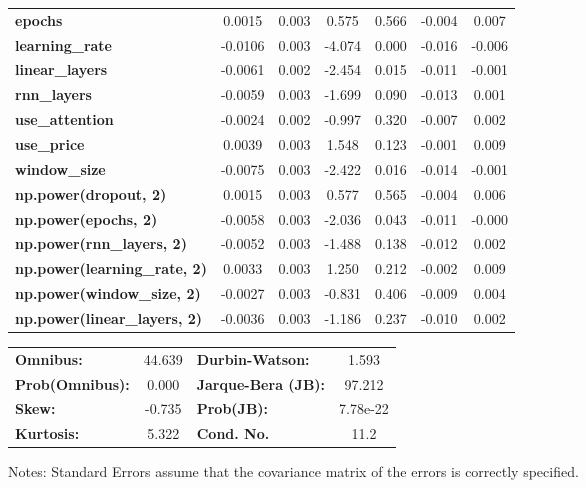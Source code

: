 \begin{center}
\begin{tabular}{lcccccc}
\textbf{epochs}                            &       0.0015  &        0.003     &     0.575  &         0.566        &       -0.004    &        0.007     \\
\textbf{learning\_rate}                    &      -0.0106  &        0.003     &    -4.074  &         0.000        &       -0.016    &       -0.006     \\
\textbf{linear\_layers}                    &      -0.0061  &        0.002     &    -2.454  &         0.015        &       -0.011    &       -0.001     \\
\textbf{rnn\_layers}                       &      -0.0059  &        0.003     &    -1.699  &         0.090        &       -0.013    &        0.001     \\
\textbf{use\_attention}                    &      -0.0024  &        0.002     &    -0.997  &         0.320        &       -0.007    &        0.002     \\
\textbf{use\_price}                        &       0.0039  &        0.003     &     1.548  &         0.123        &       -0.001    &        0.009     \\
\textbf{window\_size}                      &      -0.0075  &        0.003     &    -2.422  &         0.016        &       -0.014    &       -0.001     \\
\textbf{np.power(dropout, 2)}              &       0.0015  &        0.003     &     0.577  &         0.565        &       -0.004    &        0.006     \\
\textbf{np.power(epochs, 2)}               &      -0.0058  &        0.003     &    -2.036  &         0.043        &       -0.011    &       -0.000     \\
\textbf{np.power(rnn\_layers, 2)}          &      -0.0052  &        0.003     &    -1.488  &         0.138        &       -0.012    &        0.002     \\
\textbf{np.power(learning\_rate, 2)}       &       0.0033  &        0.003     &     1.250  &         0.212        &       -0.002    &        0.009     \\
\textbf{np.power(window\_size, 2)}         &      -0.0027  &        0.003     &    -0.831  &         0.406        &       -0.009    &        0.004     \\
\textbf{np.power(linear\_layers, 2)}       &      -0.0036  &        0.003     &    -1.186  &         0.237        &       -0.010    &        0.002     \\
\bottomrule
\end{tabular}
\begin{tabular}{lclc}
\textbf{Omnibus:}       & 44.639 & \textbf{  Durbin-Watson:     } &    1.593  \\
\textbf{Prob(Omnibus):} &  0.000 & \textbf{  Jarque-Bera (JB):  } &   97.212  \\
\textbf{Skew:}          & -0.735 & \textbf{  Prob(JB):          } & 7.78e-22  \\
\textbf{Kurtosis:}      &  5.322 & \textbf{  Cond. No.          } &     11.2  \\
\bottomrule
\end{tabular}
\end{center}

Notes: \newline
 [1] Standard Errors assume that the covariance matrix of the errors is correctly specified.